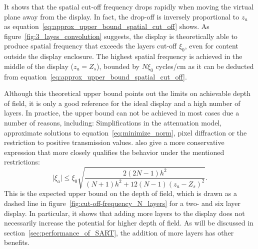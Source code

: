 It shows that the spatial cut-off frequency drops rapidly when moving the virtual plane away from the display.
In fact, the drop-off is inversely proportional to $z_a$ as equation~\ref{eq:approx_upper_bound_spatial_cut_off} shows.
As figure~\ref{fig:3_layes_convolution} suggests, the display is theoretically able to produce spatial frequency that exceeds the layers cut-off $\xi_0$, even for content outside the display enclosure.
The highest spatial frequency is achieved in the middle of the display ($z_a = Z_s$), bounded by $N \xi_0$ cycles/cm as it can be deducted from equation~\ref{eq:approx_upper_bound_spatial_cut_off}.

Although this theoretical upper bound points out the limits on achievable depth of field, it is only a good reference for the ideal display and a high number of layers.
In practice, the upper bound can not be achieved in most cases due a number of reasons, including: 
Simplifications in the attenuation model, approximate solutions to equation~\ref{eq:minimize_norm}, pixel diffraction or the restriction to positive transmission values.
\cite{WetzsteinTomo} also give a more conservative expression that more closely qualifies the behavior under the mentioned restrictions:
\begin{equation}\label{eq:expected_upper_bound_spatial_cut_off}
	\lvert \xi_a \rvert \leq \xi_0 \sqrt{ \frac{2(2N - 1) h^2}{(N + 1) h^2 + 12(N - 1)(z_a - Z_s)^2} }.
\end{equation}
This is the expected upper bound on the depth of field, which is drawn as a dashed line in figure~\ref{fig:cut-off-frequency_N_layers} for a two- and six layer display.
In particular, it shows that adding more layers to the display does not necessarily increase the potential for higher depth of field.
As will be discussed in section~\ref{sec:performance_of_SART}, the addition of more layers has other benefits.